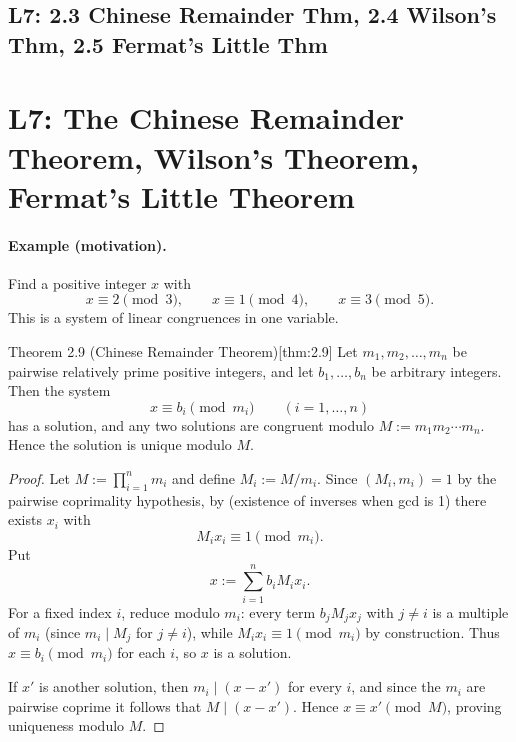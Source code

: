 \documentclass[10pt]{article}
\theoremstyle{definition}
\theoremstyle{plain}
\numberwithin{equation}{section}
\begin{document}
\newpage
\subsection{L7: 2.3 Chinese Remainder Thm, 2.4 Wilson's Thm, 2.5 Fermat's Little Thm}


\section*{L7: The Chinese Remainder Theorem, Wilson's Theorem, Fermat's Little Theorem}


\paragraph{Example (motivation).}
Find a positive integer $x$ with
\[
x\equiv 2\pmod{3},\qquad x\equiv 1\pmod{4},\qquad x\equiv 3\pmod{5}.
\]
This is a system of linear congruences in one variable.

\begin{define}{Theorem 2.9 (Chinese Remainder Theorem)}[thm:2.9]
Let $m_1,m_2,\dots,m_n$ be pairwise relatively prime positive integers, and let
$b_1,\dots,b_n$ be arbitrary integers. Then the system
\[
x\equiv b_i\pmod{m_i}\qquad(i=1,\dots,n)
\]
has a solution, and any two solutions are congruent modulo $M:=m_1m_2\cdots m_n$.
Hence the solution is unique modulo $M$.
\end{define}

\begin{proof}
Let $M:=\prod_{i=1}^n m_i$ and define $M_i:=M/m_i$. Since $(M_i,m_i)=1$ by the pairwise
coprimality hypothesis, by  (existence of inverses when gcd is 1) there
exists $x_i$ with
\[
M_i x_i\equiv 1\pmod{m_i}.
\]
Put
\[
x:=\sum_{i=1}^n b_i M_i x_i.
\]
For a fixed index $i$, reduce modulo $m_i$: every term $b_jM_jx_j$ with $j\neq i$ is a multiple
of $m_i$ (since $m_i\mid M_j$ for $j\neq i$), while $M_i x_i\equiv 1\pmod{m_i}$ by construction.
Thus $x\equiv b_i\pmod{m_i}$ for each $i$, so $x$ is a solution.

If $x'$ is another solution, then $m_i\mid (x-x')$ for every $i$, and since the $m_i$ are
pairwise coprime it follows that $M\mid (x-x')$. Hence $x\equiv x'\pmod M$, proving uniqueness
modulo $M$.
\end{proof}
\end{document}
